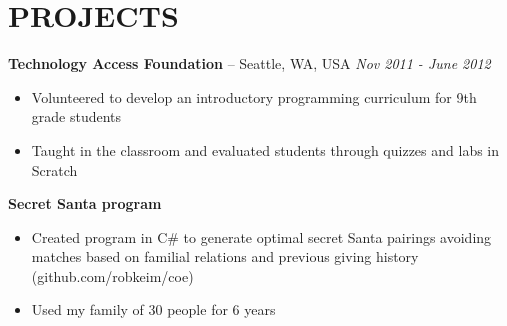 \documentclass[]{rob-keim-resume}
\begin{document}
\section{PROJECTS}

{\bf Technology Access Foundation} --  Seattle, WA, USA \hfill {\sl Nov 2011 - June 2012} 
\begin{itemize} \itemsep -2pt
	\item Volunteered to develop an introductory programming curriculum for 9th grade students
	\item Taught in the classroom and evaluated students through quizzes and labs in Scratch
\end{itemize}

{\bf Secret Santa program}
\begin{itemize} \itemsep -2pt
	\item Created program in C\# to generate optimal secret Santa pairings avoiding matches based on familial relations and previous giving history (github.com/robkeim/coe)
	\item Used my family of 30 people for 6 years
\end{itemize}


\end{document}

